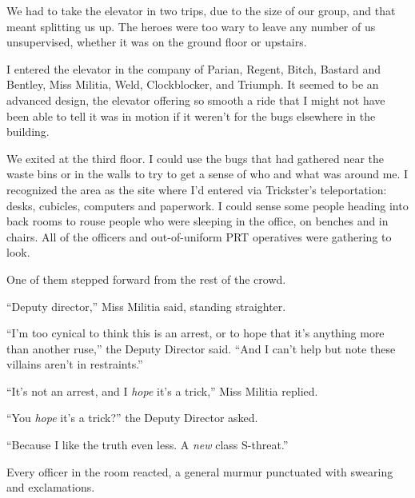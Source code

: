 





We had to take the elevator in two trips, due to the size of our group, and that meant splitting us up.  The heroes were too wary to leave any number of us unsupervised, whether it was on the ground floor or upstairs.



I entered the elevator in the company of Parian, Regent, Bitch, Bastard and Bentley, Miss Militia, Weld, Clockblocker, and Triumph.  It seemed to be an advanced design, the elevator offering so smooth a ride that I might not have been able to tell it was in motion if it weren't for the bugs elsewhere in the building.



We exited at the third floor.  I could use the bugs that had gathered near the waste bins or in the walls to try to get a sense of who and what was around me.  I recognized the area as the site where I'd entered via Trickster's teleportation: desks, cubicles, computers and paperwork.  I could sense some people heading into back rooms to rouse people who were sleeping in the office, on benches and in chairs.  All of the officers and out-of-uniform PRT operatives were gathering to look.



One of them stepped forward from the rest of the crowd.



``Deputy director,'' Miss Militia said, standing straighter.



``I'm too cynical to think this is an arrest, or to hope that it's anything more than another ruse,'' the Deputy Director said.  ``And I can't help but note these villains aren't in restraints.''



``It's not an arrest, and I \emph{hope} it's a trick,'' Miss Militia replied.



``You \emph{hope} it's a trick?'' the Deputy Director asked.



``Because I like the truth even less.  A \emph{new} class S-threat.''



Every officer in the room reacted, a general murmur punctuated with swearing and exclamations.



